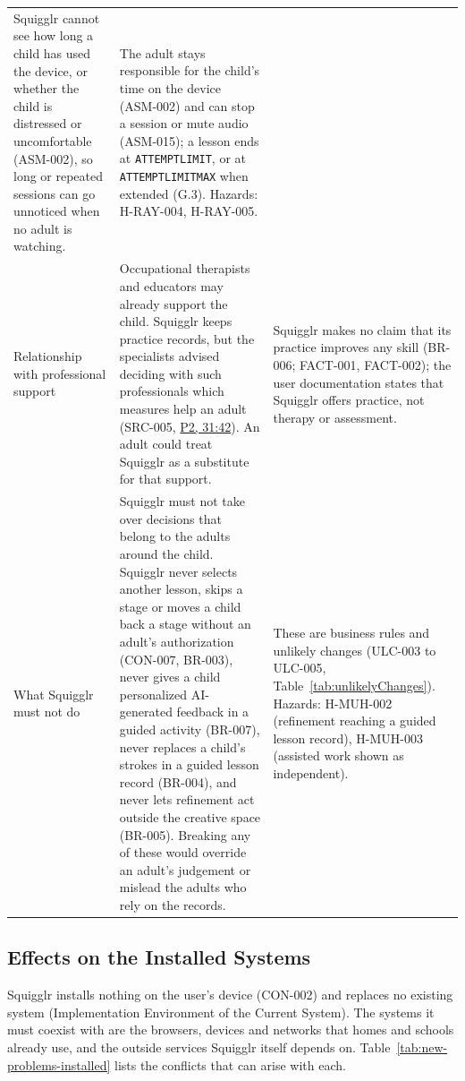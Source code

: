 \documentclass[12pt]{article}
\renewcommand{\_}{\textunderscore\allowbreak}%
\newcommand{\intlink}[3]{\hyperref[int:#1-#2]{#3}}
\newcommand{\intref}[2]{\intlink{#1}{#2}{#1, #2}}
\begin{document}
{\begin{longtable}{@{}>{\raggedright\arraybackslash}p{}%
>{\raggedright\arraybackslash}p{}%
>{\raggedright\arraybackslash}p{}@{}}
Squigglr cannot see how long a child has used the device, or whether the child
is distressed or uncomfortable (ASM-002), so long or repeated sessions can go
unnoticed when no adult is watching. & The adult stays responsible for the
child's time on the device (ASM-002) and can stop a session or mute audio
(ASM-015); a lesson ends at \texttt{ATTEMPT\_LIMIT}, or at
\texttt{ATTEMPT\_LIMIT\_MAX} when extended (G.3). Hazards: H-RAY-004, H-RAY-005.
\\
\addlinespace
Relationship with professional support & Occupational therapists and educators
may already support the child. Squigglr keeps practice records, but the
specialists advised deciding with such professionals which measures help an
adult (SRC-005, \intref{P2}{31:42}). An adult could treat Squigglr as a
substitute for that support. & Squigglr makes no claim that its practice
improves any skill (BR-006; FACT-001, FACT-002); the user documentation states
that Squigglr offers practice, not therapy or assessment. \\
\addlinespace
What Squigglr must not do & Squigglr must not take over decisions that belong to
the adults around the child. Squigglr never selects another lesson, skips a
stage or moves a child back a stage without an adult's authorization (CON-007,
BR-003), never gives a child personalized AI-generated feedback in a guided
activity (BR-007), never replaces a child's strokes in a guided lesson record
(BR-004), and never lets refinement act outside the creative space (BR-005).
Breaking any of these would override an adult's judgement or mislead the adults
who rely on the records. & These are business rules and unlikely changes
(ULC-003 to ULC-005, Table~\ref{tab:unlikelyChanges}). Hazards: H-MUH-002
(refinement reaching a guided lesson record), H-MUH-003 (assisted work shown as
independent). \\
\end{longtable}
}

\subsection{Effects on the Installed Systems}
Squigglr installs nothing on the user's device (CON-002) and replaces no
existing system (Implementation Environment of the Current System). The systems
it must coexist with are the browsers, devices and networks that homes and
schools already use, and the outside services Squigglr itself depends on.
Table~\ref{tab:new-problems-installed} lists the conflicts that can arise with
each.
\end{document}
